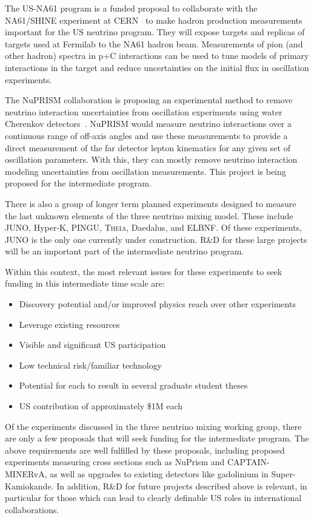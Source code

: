The US-NA61 program is a funded proposal to collaborate with the
NA61/SHINE experiment at CERN~\cite{Gazdzicki:2014bxa} to make hadron
production measurements important for the US neutrino program.  They
will expose targets and replicas of targets used at Fermilab to the
NA61 hadron beam.  Measurements of pion (and other hadron) spectra in
p+C interactions can be used to tune models of primary interactions in
the target and reduce uncertainties on the initial flux in oscillation
experiments.

The NuPRISM collaboration is proposing an experimental method to
remove neutrino interaction uncertainties from oscillation
experiments using water Cherenkov detectors~\cite{Bhadra:2014oma}.  NuPRISM would measure neutrino
interactions over a continuous range of off-axis angles and use these
measurements to provide a direct measurement of the far detector
lepton kinematics for any given set of oscillation parameters.  With
this, they can mostly remove neutrino interaction modeling
uncertainties from oscillation measurements.  This project is being
proposed for the intermediate program.

There is also a group of longer term planned experiments designed to
measure the last unknown elements of the three neutrino mixing model.
These include JUNO, Hyper-K, PINGU, \textsc{Theia}, Daedalus, and ELBNF. Of these experiments, JUNO is the only one currently under construction.  
R\&D for these large projects will be an important part of the intermediate
neutrino program.

Within this context, the most relevant issues for these experiments
to seek funding in this intermediate time scale are:
\vspace*{-0.4cm}
\begin{itemize}
\item Discovery potential and/or improved physics reach over other experiments
\vspace*{-0.4cm}
\item Leverage existing resources \vspace*{-0.4cm}
\item Visible and significant US participation \vspace*{-0.4cm}
\item Low technical risk/familiar technology \vspace*{-0.4cm}
\item Potential for each to result in several graduate student theses \vspace*{-0.4cm}
\item US contribution of approximately \$1M each \vspace*{-0.4cm}
\end{itemize}

Of the experiments discussed in the three neutrino mixing working group, there are only a few proposals that will seek funding for the intermediate program.  The above requirements are well fulfilled by these proposals, including proposed experiments
measuring cross sections such as NuPrism and CAPTAIN-MINERvA, as well
as upgrades to existing detectors like gadolinium in Super-Kamiokande.  In
addition, R\&D for future projects described above is
relevant, in particular for those which can lead to clearly definable US
roles in international collaborations.
